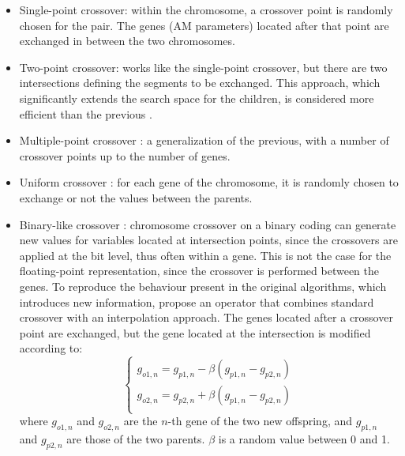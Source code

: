\documentclass{ametsoc}
\begin{document}
\begin{itemize}
	\item Single-point crossover: within the chromosome, a crossover point is randomly chosen for the pair. The genes (AM parameters) located after that point are exchanged in between the two chromosomes.
	
	\item Two-point crossover: works like the single-point crossover, but there are two intersections defining the segments to be exchanged. This approach, which significantly extends the search space for the children, is considered more efficient than the previous \citep{Beasley1993a}.
	
	\item Multiple-point crossover \citep{DeJong1975a}: a generalization of the previous, with a number of crossover points up to the number of genes.
	
	\item Uniform crossover \citep{Syswerda1989}: for each gene of the chromosome, it is randomly chosen to exchange or not the values between the parents.
	
	\item Binary-like crossover \citep{Haupt2004}: chromosome crossover on a binary coding can generate new values for variables located at intersection points, since the crossovers are applied at the bit level, thus often within a gene. This is not the case for the floating-point representation, since the crossover is performed between the genes. To reproduce the behaviour present in the original algorithms, which introduces new information, \citet{Haupt2004} propose an operator that combines standard crossover with an interpolation approach. The genes located after a crossover point are exchanged, but the gene located at the intersection is modified according to:
	\begin{equation}
	\left\lbrace \begin{array}{l} 
	g_{o1,n} = g_{p1,n} - \beta (g_{p1,n} - g_{p2,n}) \\
	g_{o2,n} = g_{p2,n} + \beta (g_{p1,n} - g_{p2,n}) \\
	\end{array} \right.
	\label{equation_mating_as_binary}
	\end{equation}
	where $g_{o1,n}$ and $g_{o2,n}$ are the $n$-th gene of the two new offspring, and $g_{p1,n}$ and $g_{p2,n}$ are those of the two parents. $\beta$ is a random value between 0 and 1.
	

\end{itemize}
\end{document}
